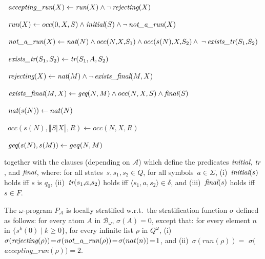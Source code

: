 \documentclass[english]{tlp}
\renewcommand{\mathit}{\displaystyle}
\newcommand{\Mathit}[1]{\mbox{\it #1}}
\begin{document}
\begin{example}
\smallskip

~$\mbox{\it{accepting\_run}}(X)\leftarrow
\mbox{\it{run}}(X) \wedge \neg\,\mbox{\it{rejecting}}(X)$

~$\mbox{\it{run}}(X)\leftarrow
\mathit{occ}(0,X,S)\wedge\mbox{\it{initial}}(S)
\wedge \neg\,\mbox{\it{not\_a\_run}}(X)$

~$\mbox{\it{not\_a\_run}}(X)\leftarrow
\mbox{\it{nat}}(N)\wedge \mathit{occ}(N,\!X,\!S_1)\wedge
\mathit{occ}(s(N),\!X,\!S_2)\,\wedge$
$\neg\,\mbox{\it{exists\_tr}}(S_1,\!S_2)$

~$\mbox{\it{exists\_tr}}(S_1,S_2) \leftarrow
\mbox{\it{tr}}(S_1,A,S_2)$

~$\mbox{\it{rejecting}}(X)\leftarrow
\mbox{\it{nat}}(M)\wedge \neg\,\mbox{\it{exists\_final}}(M,X)$

~$\mbox{\it{exists\_final}}(M,X)\leftarrow
\mbox{\it{geq}}(N,M)\wedge \mathit{occ}(N,X,S)\wedge
\mbox{\it{final}}(S)$


~$\mbox{\it{nat}}(s(N))\leftarrow nat(N)$

\makebox[60mm][l]{\makebox[2mm][r]{9.}~$\mathit{occ}(0,\llbracket S|X\rrbracket,S)\leftarrow$}

~$\mathit{occ}(s(N),\llbracket S|X\rrbracket,R) \leftarrow
\mathit{occ}(N,X,R)$



~$\mbox{\it{geq}}(s(N),s(M))\leftarrow \mathit{geq}(N,M)$

\smallskip

\noindent together with the clauses (depending on $\mathcal A$)
which define the predicates $\mbox{\it{initial}}$, $\mbox{\it{tr}}$, and
$\mbox{\it{final}}$, where: for all states~$s,s_1,s_2\!\in\!Q$, for all
symbols~$a\!\in\!\Sigma$, (i)~$\mbox{\it{initial}}(s)$ holds iff
$s$ is $q_0$, (ii)~$\mbox{\it{tr}}(s_1,\!a,\!s_2)$ holds iff $\langle
s_1,\!a,\!s_2\rangle\!\in\!\delta$, and (iii)~$\mbox{\it{final}}(s)$
holds iff $s\!\in\! F$.
 
The $\omega$-program $P_\mathcal{A}$ is locally stratified w.r.t.~the
stratification function $\sigma$ defined as follows: for every atom
$A$ in $\mathcal B_\omega$, $\sigma(A)\!=\!0$, except that: for every
element $n$ in \mbox{$\{s^k(0)\mid k\!\geq\! 0\}$,} for every infinite list
$\rho$ in $Q^\omega$,
(i)~$\sigma(\Mathit{rejecting}(\rho))\! =\!
\sigma(\Mathit{not\_a\_run}(\rho))\! =\!\sigma(\mathit{nat}(n))\! =
\!1$, and (ii)~$\sigma(\mathit{run}(\rho))\!=$ $
\sigma(${\Mathit{ac\-cept\-ing\_run}}$(\rho))\!=\!2$.


\end{example}
\end{document}
